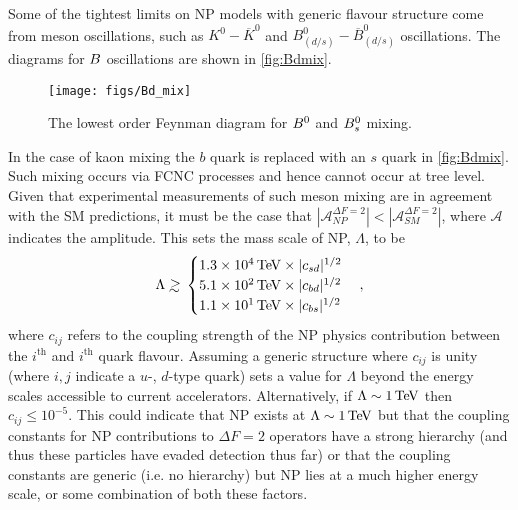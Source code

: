  Some of the tightest limits on NP models with generic flavour structure come from meson oscillations, such as $K^{0} - \overline{K}^{0}$ and $B^{0}_{(d/s)} - \overline{B}^{0}_{(d/s)}$ oscillations. The diagrams for ${B}$ oscillations are shown in \autoref{fig:Bdmix}.
\begin{figure}[!h]\def\nh{0.5\textwidth}
  \centering
  \texttt{[image: figs/Bd\_mix]}
  \caption{The lowest order Feynman diagram for ${{B}^0}$ and ${{B}^0_{s}}$ mixing.}
  \label{fig:Bdmix}
\end{figure}
In the case of kaon mixing the $b$ quark is replaced with an $s$ quark in \autoref{fig:Bdmix}.
Such mixing occurs via FCNC processes and hence cannot occur at tree level. %
Given that experimental measurements of such meson mixing are in agreement with the SM predictions\cite{bpimumuff1}, it must be the case that $|\mathcal{A}_{NP}^{\Delta F = 2}|<|\mathcal{A}_{SM}^{\Delta F = 2}|$, where $\mathcal{A}$ indicates the amplitude. This  sets the mass scale of NP, $\Lambda$, to be~\cite{kaonmix}%
\begin{equation}
  \Lambda\gsim%
  \begin{cases}
    1.3\times 10^{4}\tev \times |c_{sd}|^{1/2}\\
    5.1\times 10^{2}\tev \times |c_{bd}|^{1/2}\\
    1.1\times 10^{1}\tev \times |c_{bs}|^{1/2}\\
  \end{cases},
\end{equation}
where $c_{ij}$ refers to the coupling strength of the NP physics contribution between the $i^{\mathrm{th}}$ and $i^{\mathrm{th}}$ quark flavour.
Assuming a generic structure where $c_{ij}$ is unity (where $i,j$ indicate a $u$-, $d$-type quark) sets a value for $\Lambda$ beyond the energy scales accessible to current accelerators. Alternatively, if $\Lambda \sim 1\mathrm{\,Te\kern -0.1em V}$ then $c_{ij} \leq 10^{-5}$. This could indicate that NP exists at $\Lambda \sim 1\mathrm{\,Te\kern -0.1em V}$  but that the coupling constants for NP contributions to $\Delta F=2$ operators have a strong hierarchy (and thus these particles have evaded detection thus far) or that the coupling constants are generic (i.e. no hierarchy) but NP lies at a much higher energy scale, or some combination of both these factors.

